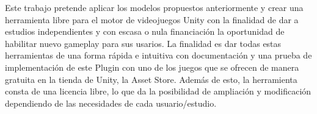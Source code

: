 Este trabajo pretende aplicar los modelos propuestos anteriormente y crear una herramienta libre para el motor de videojuegos Unity con la finalidad de dar a estudios independientes y con escasa o nula financiaci\'on la oportunidad de habilitar nuevo gameplay para sus usarios. La finalidad es dar todas estas herramientas de una forma r\'apida e intuitiva con documentaci\'on y una prueba de implementaci\'on de este Plugin con uno de los juegos que se ofrecen de manera gratuita en la tienda de Unity, la Asset Store. Adem\'as de esto, la herramienta consta de una licencia libre, lo que da la posibilidad de ampliaci\'on y modificaci\'on dependiendo de las necesidades de cada usuario/estudio.





